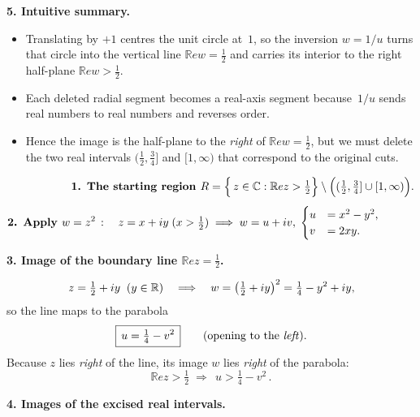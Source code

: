 \documentclass[12pt]{article}
\theoremstyle{definition} %
\theoremstyle{plain} %
\begin{document}
  \medskip
  \textbf{5.  Intuitive summary.}
  \begin{itemize}
    \item Translating by $+1$ centres the unit circle at~$1$,
          so the inversion $w=1/u$ turns that circle into the vertical
          line $\mathbb{R}e w=\tfrac12$ and carries its interior to the
          right half-plane $\mathbb{R}e w>\tfrac12$.
    \item Each deleted radial segment becomes a real-axis segment because
          \,$1/u$ sends real numbers to real numbers and reverses order.
    \item Hence the image is the half-plane to the \emph{right} of
          $\mathbb{R}e w=\tfrac12$, but we must delete the two real intervals
          $(\tfrac12,\tfrac34]$ and $[1,\infty)$ that correspond to the
          original cuts.
  \end{itemize}
\pagebreak
\begin{align}
  \textbf{1.  The starting region }R
     &=\Bigl\{\,z\in\Bbb C:\mathbb{R}e z>\tfrac12\Bigr\}
       \setminus\Bigl((\tfrac12,\tfrac34]\cup[1,\infty)\Bigr).      \\[4pt]
  \textbf{2.  Apply }w=z^{2}\,:\quad z=x+iy\;(x>\tfrac12)
     &\;\Longrightarrow\;
       w=u+iv,\;
       \begin{cases}
         u&=x^{2}-y^{2},\\
         v&=2xy.
       \end{cases}
  \end{align}
  
  \bigskip
  \textbf{3.  Image of the boundary line \(\mathbb{R}e z=\tfrac12\).}
  
  \[
     z=\tfrac12+iy\;\;(y\in\Bbb R)
     \quad\Longrightarrow\quad
     w=\bigl(\tfrac12+iy\bigr)^{2}
       =\tfrac14-y^{2}+iy,
  \]
  so the line maps to the parabola
  \[
     \boxed{\,u=\tfrac14-v^{2}\,}\qquad(\text{opening to the \emph{left}}).
  \]
  Because \(z\) lies \emph{right} of the line, its image \(w\) lies
  \emph{right} of the parabola:
  \[
     \mathbb{R}e z>\tfrac12
     \;\Longrightarrow\;
     \boxed{\,u>\tfrac14-v^{2}\,}.
  \]
  
  \bigskip
  \textbf{4.  Images of the excised real intervals.}
  
\end{document}
